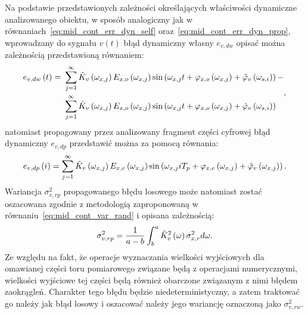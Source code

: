 Na podstawie przedstawionych zależności określających właściwości dynamiczne analizowanego obiektu, w sposób analogiczny jak w równaniach~\eqref{eq:mid_cont_err_dyn_self} oraz~\eqref{eq:mid_cont_err_dyn_prop}, wprowadzany do sygnału $v(t)$ błąd dynamiczny własny $e_{v,dw}$ opisać można zależnością przedstawioną równaniem:
\begin{equation}
\begin{split}
e_{v,dw} \left(t\right) =~
& \sum _{j = 1} ^{\infty} \tilde{K}_{v} \left(\omega_{x,j}\right) E_{x,o} \left(\omega_{x,j}\right) \sin \left( \omega_{x,j} t + \varphi_{x,o} \left(\omega_{x,j}\right) + \tilde{\varphi}_{v} \left(\omega_{s,i}\right) \right) - \\
& \sum _{j = 1} ^{\infty} \dot{K}_{v} \left(\omega_{x,j}\right) E_{x,o} \left(\omega_{x,j}\right) \sin \left( \omega_{x,j} t + \varphi_{x,o} \left(\omega_{x,j}\right) + \dot{\varphi}_{v} \left(\omega_{s,i}\right) \right)
\end{split}
\label{eq:mid_disc_err_dyn_self},
\end{equation}
natomiast propagowany przez analizowany fragment części cyfrowej błąd dynamiczny $e_{v,dp}$ przedstawić można za pomocą równania:
\begin{equation}
e_{v,dp} \left(i\right) = \sum _{j = 1} ^{\infty} \tilde{K}_{v} \left(\omega_{x,j}\right) E_{x,e} \left(\omega_{x,j}\right) \sin \left( \omega_{x,j} iT_{p} + \varphi_{x,e} \left(\omega_{x,j}\right) + \tilde{\varphi}_{v} \left(\omega_{x,j}\right) \right) \label{eq:mid_disc_err_dyn_prop}.
\end{equation}
Wariancja $\sigma_{v,rp}^{2}$ propagowanego błędu losowego może natomiast zostać oszacowana zgodnie z metodologią zaproponowaną w równaniu~\eqref{eq:mid_cont_var_rand} i opisana zależnością:
\begin{equation}
\sigma_{v,rp}^{2} = \frac{1}{a - b} \int _{b} ^{a} \tilde{K}_{v}^{2} \left(\omega\right) \sigma_{x,r}^{2} d\omega \label{eq:mid_disc_var_rand}.
\end{equation}
Ze względu na fakt, że operacje wyznaczania wielkości wyjściowych dla omawianej części toru pomiarowego związane będą z operacjami numerycznymi, wielkości wyjściowe tej części będą również obarczone związanym z nimi błędem zaokrągleń. Charakter tego błędu będzie niedeterministyczny, a zatem traktować go należy jak błąd losowy i oszacować należy jego wariancję oznaczoną jako $\sigma_{v,rw}^{2}$.

